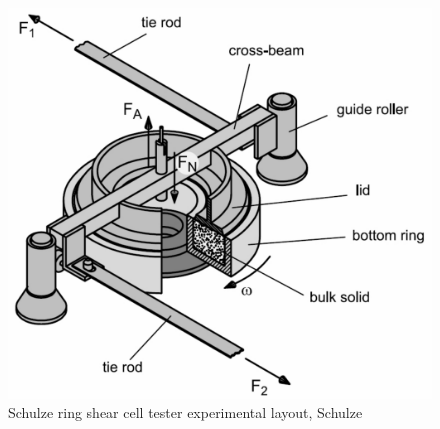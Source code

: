 \begin{figure}[!htb] 
\centering 
\includegraphics[width=.8\textwidth]{images/original/01srsct} 
\caption[Schulze ring shear cell tester]{Schulze ring shear cell tester
experimental layout, Schulze \cite{RefWorks:118}}
\label{fig:01srsct} 
\end{figure}


